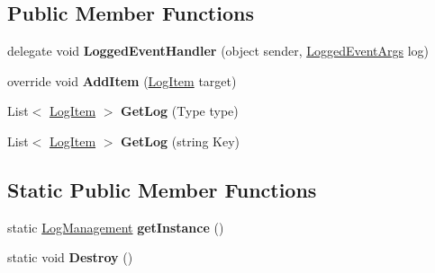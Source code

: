 \subsection*{Public Member Functions}
\begin{DoxyCompactItemize}
\item 
\hypertarget{classlib_watcher_dialog_1_1_property_item_1_1_log_1_1_log_management_a2e8b96891f4966e8919ef7dca6858488}{delegate void {\bfseries Logged\+Event\+Handler} (object sender, \hyperlink{classlib_watcher_dialog_1_1_property_item_1_1_log_1_1_logged_event_args}{Logged\+Event\+Args} log)}\label{classlib_watcher_dialog_1_1_property_item_1_1_log_1_1_log_management_a2e8b96891f4966e8919ef7dca6858488}

\item 
\hypertarget{classlib_watcher_dialog_1_1_property_item_1_1_log_1_1_log_management_a6780ddec612fcae241a44399af06e85f}{override void {\bfseries Add\+Item} (\hyperlink{classlib_watcher_dialog_1_1_property_item_1_1_logger_1_1_log_item}{Log\+Item} target)}\label{classlib_watcher_dialog_1_1_property_item_1_1_log_1_1_log_management_a6780ddec612fcae241a44399af06e85f}

\item 
\hypertarget{classlib_watcher_dialog_1_1_property_item_1_1_log_1_1_log_management_abe83fcd7f582f8d88146042d16afcef9}{List$<$ \hyperlink{classlib_watcher_dialog_1_1_property_item_1_1_logger_1_1_log_item}{Log\+Item} $>$ {\bfseries Get\+Log} (Type type)}\label{classlib_watcher_dialog_1_1_property_item_1_1_log_1_1_log_management_abe83fcd7f582f8d88146042d16afcef9}

\item 
\hypertarget{classlib_watcher_dialog_1_1_property_item_1_1_log_1_1_log_management_afccb9814a4ac50eb70e0938e323c6f18}{List$<$ \hyperlink{classlib_watcher_dialog_1_1_property_item_1_1_logger_1_1_log_item}{Log\+Item} $>$ {\bfseries Get\+Log} (string Key)}\label{classlib_watcher_dialog_1_1_property_item_1_1_log_1_1_log_management_afccb9814a4ac50eb70e0938e323c6f18}

\end{DoxyCompactItemize}
\subsection*{Static Public Member Functions}
\begin{DoxyCompactItemize}
\item 
\hypertarget{classlib_watcher_dialog_1_1_property_item_1_1_log_1_1_log_management_a287f4715cb3148b101ac907407050feb}{static \hyperlink{classlib_watcher_dialog_1_1_property_item_1_1_log_1_1_log_management}{Log\+Management} {\bfseries get\+Instance} ()}\label{classlib_watcher_dialog_1_1_property_item_1_1_log_1_1_log_management_a287f4715cb3148b101ac907407050feb}

\item 
\hypertarget{classlib_watcher_dialog_1_1_property_item_1_1_log_1_1_log_management_a58b349c46a33a5ccc7f664370011ca36}{static void {\bfseries Destroy} ()}\label{classlib_watcher_dialog_1_1_property_item_1_1_log_1_1_log_management_a58b349c46a33a5ccc7f664370011ca36}

\end{DoxyCompactItemize}
